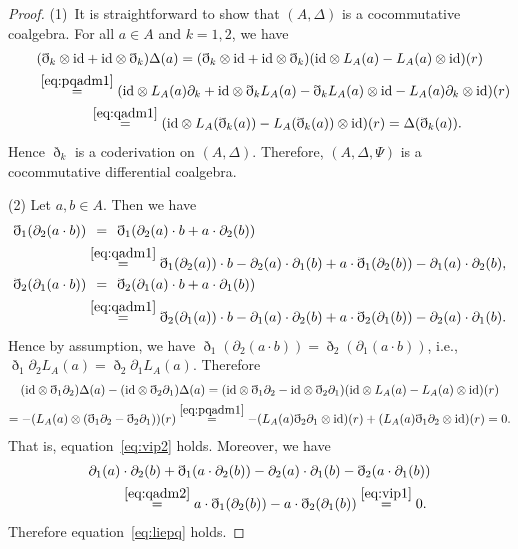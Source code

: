 \documentclass[pdftex]{sigma}
\numberwithin{equation}{section}
\newcommand{\id}{\mathrm{id}}
\begin{document}
\begin{proof} (1)~It is straightforward to show that $(A, \Delta)$ is a cocommutative coalgebra.
 For all $a \in A$ and $k=1, 2$, we have
 \begin{gather*}
 (\eth_k \otimes \id + \id \otimes \eth_k)\Delta(a) = (\eth_k \otimes \id + \id \otimes \eth_k)(\id \otimes L_A(a) - L_A(a) \otimes \id )(r) \\
 \qquad{} \overset{\eqref{eq:pqadm1}}{=} (\id \otimes L_A(a) \partial_k + \id \otimes \eth_k L_A(a) - \eth_k L_A(a) \otimes \id - L_A(a) \partial_k \otimes \id ) (r) \\
\qquad{} \;\overset{\eqref{eq:qadm1}}{=} (\id \otimes L_A(\eth_k(a)) - L_A(\eth_k(a)) \otimes \id ) (r) = \Delta(\eth_k(a)).
	\end{gather*}
 Hence $\eth_k$ is a coderivation on $(A, \Delta)$.
 Therefore, $(A, \Delta, \Psi)$ is a cocommutative differential coalgebra.

 (2)
 Let $a, b \in A$. Then we have
 \begin{align*}
 \eth_1(\partial_2(a \cdot b)) &\overset{\hphantom{(0.0)}}{=} \eth_1(\partial_2(a) \cdot b + a \cdot \partial_2(b)) \\
 &\overset{\eqref{eq:qadm1}}{=} \eth_1(\partial_2(a)) \cdot b - \partial_2(a) \cdot \partial_1(b) + a \cdot \eth_1(\partial_2(b)) - \partial_1(a) \cdot \partial_2(b), \\
 \eth_2(\partial_1(a \cdot b)) &\overset{\hphantom{(0.0)}}{=} \eth_2(\partial_1(a) \cdot b + a \cdot \partial_1(b)) \\
 &\overset{\eqref{eq:qadm1}}{=} \eth_2(\partial_1(a)) \cdot b - \partial_1(a) \cdot \partial_2(b) + a \cdot \eth_2(\partial_1(b)) - \partial_2(a) \cdot \partial_1(b).
 \end{align*}
 Hence by assumption, we have
 $\eth_1(\partial_2(a \cdot b)) = \eth_2(\partial_1(a \cdot b))$, i.e.,
 $\eth_1 \partial_2 L_A(a) = \eth_2 \partial_1 L_A(a)$.
 Therefore
 \begin{gather*}
 (\id \otimes \eth_1 \partial_2)\Delta(a) - (\id \otimes \eth_2 \partial_1)\Delta(a) = (\id \otimes \eth_1 \partial_2 - \id \otimes \eth_2 \partial_1)(\id \otimes L_A(a) - L_A(a) \otimes \id )(r) \\
 = - (L_A(a) \otimes (\eth_1 \partial_2 - \eth_2 \partial_1) )(r) \overset{\eqref{eq:pqadm1}}{=} - (L_A(a) \eth_2 \partial_1 \otimes \id )(r) + (L_A(a) \eth_1 \partial_2 \otimes \id)(r) = 0.
	\end{gather*}
 That is, equation~\eqref{eq:vip2} holds. Moreover, we have
 \begin{gather*}
 \partial_1(a) \cdot \partial_2(b) + \eth_1(a \cdot \partial_2(b)) - \partial_2(a) \cdot \partial_1(b) - \eth_2(a \cdot \partial_1(b))\\
 \qquad{} \overset{\eqref{eq:qadm2}}{=} a \cdot \eth_1(\partial_2(b)) - a \cdot \eth_2(\partial_1(b)) \overset{\eqref{eq:vip1}}{=} 0.
 \end{gather*}
 Therefore equation~\eqref{eq:liepq} holds.
\end{proof}
\end{document}
